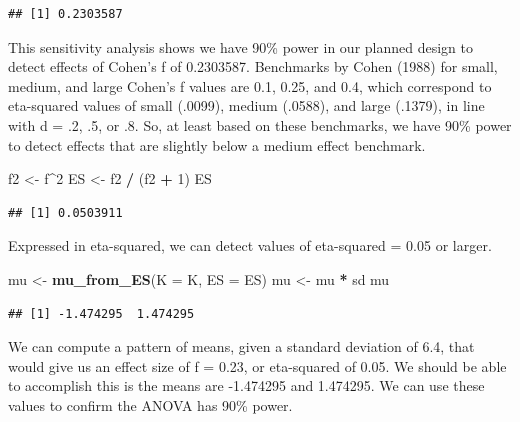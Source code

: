 \documentclass[]{book}
\newenvironment{Shaded}{\begin{snugshade}}{\end{snugshade}}
\newcommand{\DataTypeTok}[1]{\textcolor[rgb]{0.13,0.29,0.53}{#1}}
\newcommand{\DecValTok}[1]{\textcolor[rgb]{0.00,0.00,0.81}{#1}}
\newcommand{\KeywordTok}[1]{\textcolor[rgb]{0.13,0.29,0.53}{\textbf{#1}}}
\newcommand{\NormalTok}[1]{#1}
\newcommand{\OperatorTok}[1]{\textcolor[rgb]{0.81,0.36,0.00}{\textbf{#1}}}
\newcommand{\StringTok}[1]{\textcolor[rgb]{0.31,0.60,0.02}{#1}}
\begin{document}
\begin{verbatim}
## [1] 0.2303587
\end{verbatim}

This sensitivity analysis shows we have 90\% power in our planned design to detect effects of Cohen's f of 0.2303587. Benchmarks by Cohen (1988) for small, medium, and large Cohen's f values are 0.1, 0.25, and 0.4, which correspond to eta-squared values of small (.0099), medium (.0588), and large (.1379), in line with d = .2, .5, or .8. So, at least based on these benchmarks, we have 90\% power to detect effects that are slightly below a medium effect benchmark.

\begin{Shaded}
\begin{Highlighting}[]
\NormalTok{f2 <-}\StringTok{ }\NormalTok{f}\OperatorTok{^}\DecValTok{2}
\NormalTok{ES <-}\StringTok{ }\NormalTok{f2 }\OperatorTok{/}\StringTok{ }\NormalTok{(f2 }\OperatorTok{+}\StringTok{ }\DecValTok{1}\NormalTok{)}
\NormalTok{ES}
\end{Highlighting}
\end{Shaded}

\begin{verbatim}
## [1] 0.0503911
\end{verbatim}

Expressed in eta-squared, we can detect values of eta-squared = 0.05 or larger.

\begin{Shaded}
\begin{Highlighting}[]
\NormalTok{mu <-}\StringTok{ }\KeywordTok{mu_from_ES}\NormalTok{(}\DataTypeTok{K =}\NormalTok{ K, }\DataTypeTok{ES =}\NormalTok{ ES)}
\NormalTok{mu <-}\StringTok{ }\NormalTok{mu }\OperatorTok{*}\StringTok{ }\NormalTok{sd}
\NormalTok{mu}
\end{Highlighting}
\end{Shaded}

\begin{verbatim}
## [1] -1.474295  1.474295
\end{verbatim}

We can compute a pattern of means, given a standard deviation of 6.4, that would give us an effect size of f = 0.23, or eta-squared of 0.05. We should be able to accomplish this is the means are -1.474295 and 1.474295. We can use these values to confirm the ANOVA has 90\% power.
\end{document}
